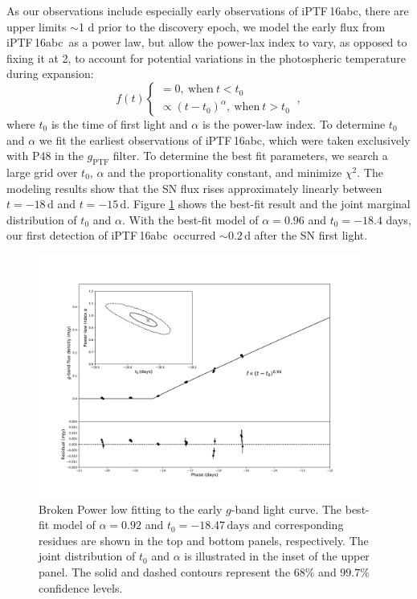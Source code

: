 \documentclass[twocolumn]{aastex61}
\newcommand{\abc}{iPTF\,16abc}
\begin{document}
As our observations include especially early observations of \abc, there are upper limits $\sim$1 d prior to the discovery epoch, we model the early flux from \abc\ as a power law, but allow the power-lax index to vary, as opposed to fixing it at 2, to account for potential variations in the photospheric temperature during expansion:
\begin{equation}
  \label{eq:broken_power_law}
  f(t) \left\{
    \begin{array}{ll}
      = 0,\ \textrm{when}\ t<t_0 \\
      \propto (t-t_0)^{\alpha},\ \textrm{when}\ t>t_0
    \end{array}
  \right.\ ,
\end{equation}
where $t_0$ is the time of first light and $\alpha$ is the power-law index. To determine $t_0$ and $\alpha$ we fit the earliest observations of \abc, which were taken exclusively with P48 in the $g_\mathrm{PTF}$ filter. To determine the best fit parameters, we search a large grid over $t_0$, $\alpha$
and the proportionality constant, and minimize $\chi^2$. 
The modeling results show that the SN flux rises approximately
linearly between
$t=-18\,\textrm{d}$ and $t=-15\,\textrm{d}$. Figure \ref{fig:early_lc_fit} shows the best-fit result and
the joint marginal distribution of $t_0$ and $\alpha$. With the
best-fit model of $\alpha=0.96$ and $t_0=-18.4$ days, our first
detection of \abc\ occurred $\sim{0.2}\,\textrm{d}$ after 
the SN first light.

\begin{figure}[!htb]
  \centering
  \includegraphics[width=0.95\textwidth]{early_lc.pdf}
  \caption{Broken Power low fitting to the early $g$-band light
    curve. The best-fit model of $\alpha=0.92$ and $t_0=-18.47\,\textrm{days}$
    and corresponding residues are shown in the top and bottom panels, respectively.
    The joint distribution of $t_0$ and $\alpha$ is illustrated in the inset of
    the upper panel. The solid and dashed contours represent the $68\%$ and $99.7\%$
    confidence levels.
  }
  \label{fig:early_lc_fit}
\end{figure}
\end{document}
